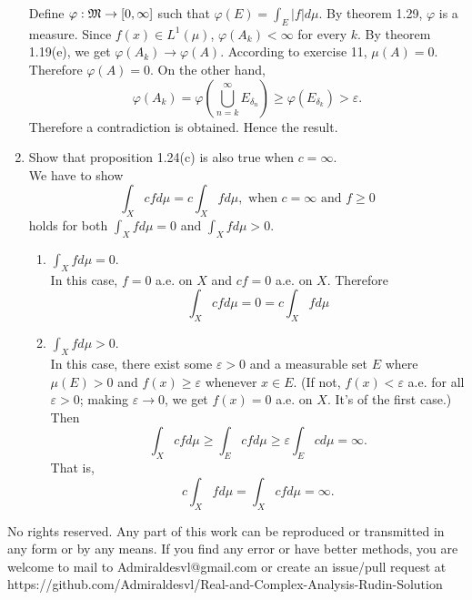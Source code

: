 \documentclass{article}
\begin{document}
\begin{enumerate}
 	Define $\varphi:\mathfrak{M}\to[0,\infty]$ such that $\varphi(E)=\int_{E}|f|d\mu$. By theorem 1.29, $\varphi$ is a measure. Since $f(x)\in{L^1(\mu)}$, $\varphi(A_k)<\infty$ for every $k$. By theorem 1.19(e), we get $\varphi(A_k)\to\varphi(A)$. According to exercise 11, $\mu(A)=0$. Therefore $\varphi(A)=0$. On the other hand,
 	\[
 		\varphi(A_k)=\varphi(\bigcup_{n=k}^{\infty}E_{\delta_n})\geq\varphi(E_{\delta_k})>\varepsilon.
 	\]
 	Therefore a contradiction is obtained. Hence the result.
 	\item \exercise Show that proposition 1.24(c) is also true when $c=\infty$.\\
 	\solution We have to show
 	\[
 		\int_Xcfd\mu=c\int_{X}fd\mu,\text{ when }c=\infty\text{ and }f\geq0
 	\]
 	holds for both $\int_{X}fd\mu=0$ and $\int_{X}fd\mu>0$.
 	\begin{enumerate}
 		\item $\int_{X}fd\mu=0$.\\
 		
 		In this case, $f=0$ a.e. on $X$ and $cf=0$ a.e. on $X$. Therefore
 		\[
 			\int_{X}cfd\mu=0=c\int_{X}fd\mu
 		\]
 		\item $\int_{X}fd\mu>0$.\\
 		
 		In this case, there exist some $\varepsilon>0$ and a measurable set $E$ where $\mu(E)>0$ and $f(x)\geq\varepsilon$ whenever $x\in{E}$. (If not, $f(x)<\varepsilon$ a.e. for all $\varepsilon>0$; making $\varepsilon\to0$, we get $f(x)=0$ a.e. on $X$. It's of the first case.) Then
 		\[
 			\int_{X}cfd\mu\geq\int_{E}cfd\mu\geq\varepsilon\int_{E}cd\mu=\infty.
 		\]
 		That is,
 		\[
 			c\int_{X}fd\mu=\int_{X}cfd\mu=\infty.
 		\]
 	\end{enumerate}
\end{enumerate}
No rights reserved. Any part of this work can be reproduced or transmitted in any form or by any means. If you find any error or have better methods, you are welcome to mail to Admiraldesvl@gmail.com or create an issue/pull request at https://github.com/Admiraldesvl/Real-and-Complex-Analysis-Rudin-Solution
\end{document}
